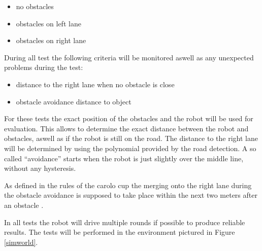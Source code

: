 \begin{itemize}
	\item no obstacles
	\item obstacles on left lane
	\item obstacles on right lane
\end{itemize}

During all test the following criteria will be monitored aswell as any unexpected problems during the test:

\begin{itemize}
	\item distance to the right lane when no obstacle is close
	\item obstacle avoidance distance to object
\end{itemize}

For these tests the exact position of the obstacles and the robot will be used for evaluation. This allows to determine the exact distance between the robot and obstacles, aswell as if the robot is still on the road. The distance to the right lane will be determined by using the polynomial provided by the road detection. A so called ``avoidance'' starts when the robot is just slightly over the middle line, without any hysteresis.

As defined in the rules of the carolo cup the merging onto the right lane during the obstacle avoidance is supposed to take place within the next two meters after an obstacle \cite{carolocup}.

In all tests the robot will drive multiple rounds if possible to produce reliable results. The tests will be performed in the environment pictured in Figure \ref{simworld}.\\












